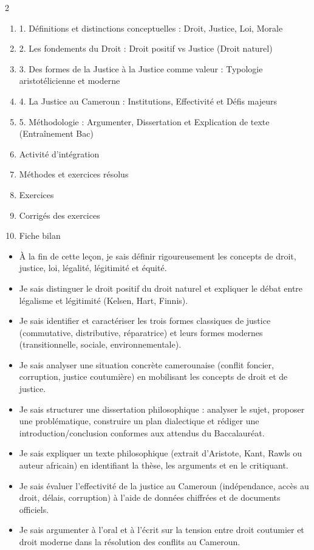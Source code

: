 \documentclass[11pt]{article}
\begin{document}
\begin{sommaire}
\begin{multicols}{2}
\begin{enumerate}
\item 1. Définitions et distinctions conceptuelles : Droit, Justice, Loi, Morale
\item 2. Les fondements du Droit : Droit positif vs Justice (Droit naturel)
\item 3. Des formes de la Justice à la Justice comme valeur : Typologie aristotélicienne et moderne
\item 4. La Justice au Cameroun : Institutions, Effectivité et Défis majeurs
\item 5. Méthodologie : Argumenter, Dissertation et Explication de texte (Entraînement Bac)
\item Activité d'intégration
\item Méthodes et exercices résolus
\item Exercices
\item Corrigés des exercices
\item Fiche bilan
\end{enumerate}
\end{multicols}
\end{sommaire}

\begin{objectifs}
\begin{itemize}
\item À la fin de cette leçon, je sais définir rigoureusement les concepts de droit, justice, loi, légalité, légitimité et équité.
\item Je sais distinguer le droit positif du droit naturel et expliquer le débat entre légalisme et légitimité (Kelsen, Hart, Finnis).
\item Je sais identifier et caractériser les trois formes classiques de justice (commutative, distributive, réparatrice) et leurs formes modernes (transitionnelle, sociale, environnementale).
\item Je sais analyser une situation concrète camerounaise (conflit foncier, corruption, justice coutumière) en mobilisant les concepts de droit et de justice.
\item Je sais structurer une dissertation philosophique : analyser le sujet, proposer une problématique, construire un plan dialectique et rédiger une introduction/conclusion conformes aux attendus du Baccalauréat.
\item Je sais expliquer un texte philosophique (extrait d'Aristote, Kant, Rawls ou auteur africain) en identifiant la thèse, les arguments et en le critiquant.
\item Je sais évaluer l'effectivité de la justice au Cameroun (indépendance, accès au droit, délais, corruption) à l'aide de données chiffrées et de documents officiels.
\item Je sais argumenter à l'oral et à l'écrit sur la tension entre droit coutumier et droit moderne dans la résolution des conflits au Cameroun.
\end{itemize}
\end{objectifs}
\end{document}
